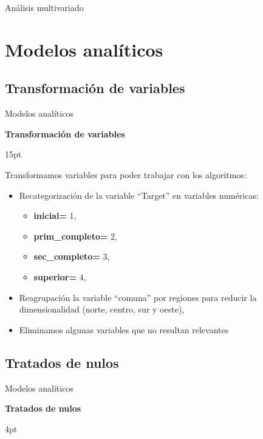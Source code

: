 \documentclass[pdf]{beamer}
\def\vspace{}%
\begin{document}
{\begin{frame}{Análisis multivariado}
\end{frame}

\section{Modelos analíticos}

    \subsection{Transformación de variables}

\begin{frame}{Modelos analíticos}

    \begin{Large}
        \textbf{Transformación de variables}
    \end{Large}
    \vspace{15pt}

    Transformamos variables para poder trabajar con los algoritmos:
    \begin{itemize}
        \item Recategorización de la variable ``Target'' en variables numéricas:
        \begin{itemize}
            \item \textbf{inicial=} 1,
            \item \textbf{prim\_completo=} 2,
            \item \textbf{sec\_completo=} 3,
            \item \textbf{superior=} 4,
        \end{itemize}
        \item Reagrupación la variable ``comuna'' por regiones para reducir la dimensionalidad (norte, centro, sur y oeste),
        \item Eliminamos algunas variables que no resultan relevantes 
    \end{itemize}
    
\end{frame}

    \subsection{Tratados de nulos}
    
\begin{frame}{Modelos analíticos}
    \begin{Large}
        \textbf{Tratados de nulos}
    \end{Large}
    \vspace{4pt}


\end{frame}}
\end{document}
